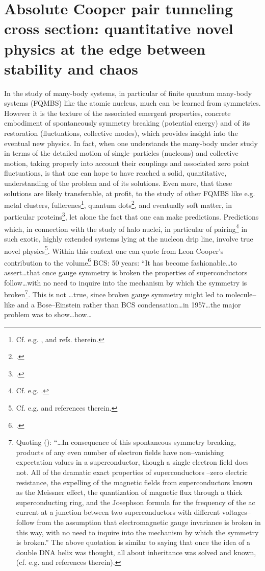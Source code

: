 \section[Absolute Cooper pair tunneling cross section]{Absolute Cooper pair tunneling cross section: quantitative novel physics at the edge between stability and chaos}\label{App3C}
In the study of many-body systems, in particular of finite quantum many-body systems (FQMBS) like the atomic nucleus, much can be learned from symmetries.  However it is the texture of the associated emergent properties, concrete embodiment of spontaneously symmetry breaking (potential energy) and of its restoration (fluctuations, collective modes), which provides insight into the eventual new physics. In fact, when one understands the many-body under study in terms of the detailed motion of single--particles (nucleons) and collective motion, taking properly into account their couplings and associated zero point fluctuations, is that one can hope to have reached a solid, quantitative, understanding of the problem and of its solutions. Even more, that these solutions are likely transferable, at profit, to the study of other FQMBS like e.g. metal clusters, fullerenes\footnote{Cf. e.g. \cite{Gunnarsson:04}, \cite{Broglia:04b} and refs. therein.}, quantum dots\footnote{\cite{Lipparini:03}.}, and eventually soft matter, in particular proteins\footnote{\cite{Broglia:13b}.}, let alone the fact that one can make predictions. Predictions which, in connection with the study of halo nuclei, in particular of pairing\footnote{Cf. e.g. \cite{Broglia:13}.} in such exotic, highly extended systems lying at the nucleon drip line, involve true novel physics\footnote{Cf. e.g. \cite{Barranco:01,Tanihata:08,Potel:10} and references therein.}. Within this context one can quote from Leon Cooper's contribution to the volume\footnote{\cite{Cooper:11}.} BCS: 50 years: ``It has become fashionable\dots to assert\dots that once gauge symmetry is broken the properties of superconductors follow\dots with no need to inquire into the mechanism by which the symmetry is broken\footnote{Quoting (\cite{Weinberg:11}): ``\dots In consequence of this spontaneous symmetry breaking, products of any even number of electron fields have non--vanishing expectation values in a superconductor, though a single electron field does not. All of the dramatic exact properties of superconductors --zero electric resistance, the expelling of the magnetic fields from superconductors known as the Meissner effect, the quantization of magnetic flux through a thick superconducting ring, and the Josephson formula for the frequency of the ac current at a junction between two superconductors with different voltages-- follow from the assumption that electromagnetic gauge invariance is broken in this way, with no need to inquire into the mechanism by which the symmetry is broken.'' The above quotation is similar to saying that once the idea of a double DNA helix was thought, all about inheritance was solved and known, (cf. e.g. \cite{Stent:80} and references therein).}. This is not \dots true, since broken gauge symmetry might led to molecule--like and a Bose--Einstein rather than BCS condensation\dots in 1957\dots the major problem was to show\dots how\dots 